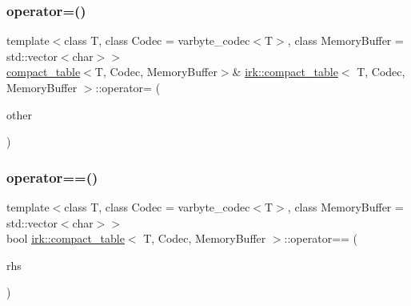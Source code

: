 \subsubsection{\texorpdfstring{operator=()}{operator=()}}
{\footnotesize\ttfamily template$<$class T, class Codec = varbyte\+\_\+codec$<$\+T$>$, class Memory\+Buffer = std\+::vector$<$char$>$$>$ \\
\mbox{\hyperlink{classirk_1_1compact__table}{compact\+\_\+table}}$<$T, Codec, Memory\+Buffer$>$\& \mbox{\hyperlink{classirk_1_1compact__table}{irk\+::compact\+\_\+table}}$<$ T, Codec, Memory\+Buffer $>$\+::operator= (\begin{DoxyParamCaption}\item[{const \mbox{\hyperlink{classirk_1_1compact__table}{compact\+\_\+table}}$<$ T, Codec, Memory\+Buffer $>$ \&}]{other }\end{DoxyParamCaption})\hspace{0.3cm}{\ttfamily [inline]}}

\mbox{\label{classirk_1_1compact__table_ab0fbc092d98001d97e8ec78e24f4040d}} 
\subsubsection{\texorpdfstring{operator==()}{operator==()}}
{\footnotesize\ttfamily template$<$class T, class Codec = varbyte\+\_\+codec$<$\+T$>$, class Memory\+Buffer = std\+::vector$<$char$>$$>$ \\
bool \mbox{\hyperlink{classirk_1_1compact__table}{irk\+::compact\+\_\+table}}$<$ T, Codec, Memory\+Buffer $>$\+::operator== (\begin{DoxyParamCaption}\item[{const \mbox{\hyperlink{classirk_1_1compact__table}{compact\+\_\+table}}$<$ T, Codec $>$ \&}]{rhs }\end{DoxyParamCaption})\hspace{0.3cm}{\ttfamily [inline]}}

\mbox{\label{classirk_1_1compact__table_a3233b841db79f2d8fdba81c880b05d88}} 
